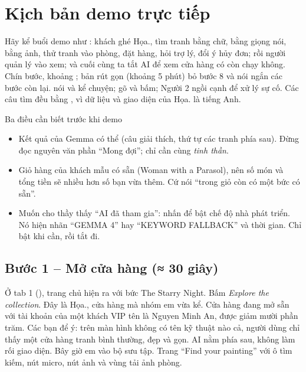 \section{Kịch bản demo trực tiếp}\label{sec:demo}
Hãy kể buổi demo như : khách ghé Họa., tìm tranh bằng chữ, bằng giọng nói, bằng ảnh, thử tranh vào phòng, đặt hàng, hỏi trợ lý, đổi ý hủy đơn; rồi người quản lý vào xem; và cuối cùng ta tắt AI để xem cửa hàng có còn chạy không. Chín bước, khoảng ; bản rút gọn (khoảng 5 phút) bỏ bước 8 và nói ngắn các bước còn lại.
 nói và kể chuyện;  gõ và bấm; Người 2 ngồi cạnh để xử lý sự cố. Các câu tìm đều bằng , vì dữ liệu và giao diện của Họa. là tiếng Anh.

\begin{note}[warn]{Ba điều cần biết trước khi demo}
\begin{itemize}
\item Kết quả của Gemma có thể  (câu giải thích, thứ tự các tranh phía sau). Đừng đọc nguyên văn phần ``Mong đợi''; chỉ cần cùng \emph{tinh thần}.
\item Giỏ hàng của khách mẫu có sẵn  (Woman with a Parasol), nên số món và tổng tiền sẽ nhiều hơn số bạn vừa thêm. Cứ nói ``trong giỏ còn có một bức có sẵn''.
\item Muốn cho thầy thấy ``AI đã tham gia'': nhấn  để bật chế độ nhà phát triển. Nó hiện nhãn ``GEMMA 4'' hay ``KEYWORD FALLBACK'' và thời gian. Chỉ bật khi cần, rồi tắt đi.
\end{itemize}
\end{note}

\subsection{Bước 1 -- Mở cửa hàng \normalfont\small(≈ 30 giây)}
Ở tab 1 (), trang chủ hiện ra với bức The Starry Night. Bấm \emph{Explore the collection}.
Đây là Họa., cửa hàng mà nhóm em vừa kể. Cửa hàng đang mở sẵn với tài khoản của một khách VIP tên là Nguyen Minh An, được giảm mười phần trăm. Các bạn để ý: trên màn hình không có tên kỹ thuật nào cả, người dùng chỉ thấy một cửa hàng tranh bình thường, đẹp và gọn. AI nằm phía sau, không làm rối giao diện. Bây giờ em vào bộ sưu tập.
Trang ``Find your painting'' với ô tìm kiếm, nút micro, nút ảnh và vùng tải ảnh phòng.

